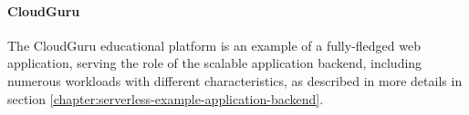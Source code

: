 



\paragraph{CloudGuru} \label{chapter:serverless-suitability-cloudguru}

The CloudGuru educational platform is an example of a fully-fledged web application, serving the role of the scalable application backend, including numerous workloads with different characteristics, as described in more details in section \ref{chapter:serverless-example-application-backend}.

